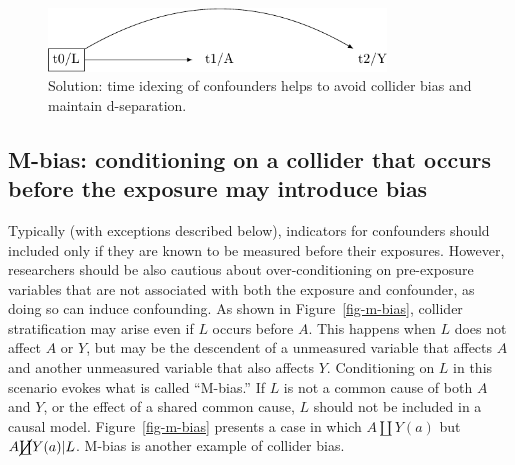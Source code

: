 \documentclass[
  singlecolumn]{report}
\begin{document}
\begin{figure}

{\centering \includegraphics[width=0.8\textwidth,height=\textheight]{causal-dags_files/figure-pdf/fig-dag-common-effect-solution-1.pdf}

}

\caption{\label{fig-dag-common-effect-solution}Solution: time idexing of
confounders helps to avoid collider bias and maintain d-separation.}

\end{figure}

\hypertarget{m-bias-conditioning-on-a-collider-that-occurs-before-the-exposure-may-introduce-bias}{%
\subsection{M-bias: conditioning on a collider that occurs before the
exposure may introduce
bias}\label{m-bias-conditioning-on-a-collider-that-occurs-before-the-exposure-may-introduce-bias}}

Typically (with exceptions described below), indicators for confounders
should included only if they are known to be measured before their
exposures. However, researchers should be also cautious about
over-conditioning on pre-exposure variables that are not associated with
both the exposure and confounder, as doing so can induce confounding. As
shown in Figure~\ref{fig-m-bias}, collider stratification may arise even
if \(L\) occurs before \(A\). This happens when \(L\) does not affect
\(A\) or \(Y\), but may be the descendent of a unmeasured variable that
affects \(A\) and another unmeasured variable that also affects \(Y\).
Conditioning on \(L\) in this scenario evokes what is called ``M-bias.''
If \(L\) is not a common cause of both \(A\) and \(Y\), or the effect of
a shared common cause, \(L\) should not be included in a causal model.
Figure~\ref{fig-m-bias} presents a case in which \(A \coprod Y(a)\) but
\(A \cancel{\coprod} Y(a)| L\). M-bias is another example of collider
bias.
\end{document}
